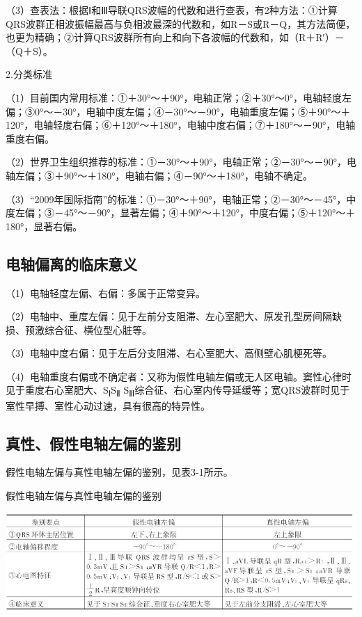 （3）查表法：根据Ⅰ和Ⅲ导联QRS波幅的代数和进行查表，有2种方法：①计算QRS波群正相波振幅最高与负相波最深的代数和，如R－S或R－Q，其方法简便，也更为精确；②计算QRS波群所有向上和向下各波幅的代数和，如（R＋R′）－（Q＋S）。

2.分类标准

（1）目前国内常用标准：①＋30°～＋90°，电轴正常；②＋30°～0°，电轴轻度左偏；③0°～－30°，电轴中度左偏；④－30°～－90°，电轴重度左偏；⑤＋90°～＋120°，电轴轻度右偏；⑥＋120°～＋180°，电轴中度右偏；⑦＋180°～－90°，电轴重度右偏。

（2）世界卫生组织推荐的标准：①－30°～＋90°，电轴正常；②－30°～－90°，电轴左偏；③＋90°～＋180°，电轴右偏；④－90°～＋180°，电轴不确定。

（3）“2009年国际指南”的标准：①－30°～＋90°，电轴正常；②－30°～－45°，中度左偏；③－45°～－90°，显著左偏；④＋90°～＋120°，中度右偏；⑤＋120°～＋180°，显著右偏。

\protect\hypertarget{text00009.htmlux5cux23subid49}{}{}

\subsection{电轴偏离的临床意义}

（1）电轴轻度左偏、右偏：多属于正常变异。

（2）电轴中、重度左偏：见于左前分支阻滞、左心室肥大、原发孔型房间隔缺损、预激综合征、横位型心脏等。

（3）电轴中度右偏：见于左后分支阻滞、右心室肥大、高侧壁心肌梗死等。

（4）电轴重度右偏或不确定者：又称为假性电轴左偏或无人区电轴。窦性心律时见于重度右心室肥大、S\textsubscript{Ⅰ}S\textsubscript{Ⅱ} S\textsubscript{Ⅲ}综合征、右心室内传导延缓等；宽QRS波群时见于室性早搏、室性心动过速，具有很高的特异性。

\protect\hypertarget{text00009.htmlux5cux23subid50}{}{}

\subsection{真性、假性电轴左偏的鉴别}

假性电轴左偏与真性电轴左偏的鉴别，见表3-1所示。

\begin{table}[htbp]
\centering
\caption{假性电轴左偏与真性电轴左偏的鉴别}
\label{tab3-1}
\includegraphics[width=5.46875in,height=1.51042in]{./images/Image00059.jpg}
\end{table}

